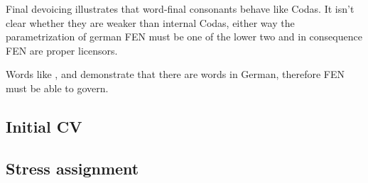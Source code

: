 Final devoicing illustrates that word-final consonants behave like Codas.
It isn't clear whether they are weaker than internal Codas, either way the
parametrization of german FEN must be one of the lower two and in consequence
FEN are proper licensors.

Words like ,  and  demonstrate that there
are  words in German, therefore FEN must be able to govern.


\subsection{Initial CV}


\subsection{Stress assignment}
\TODO{}